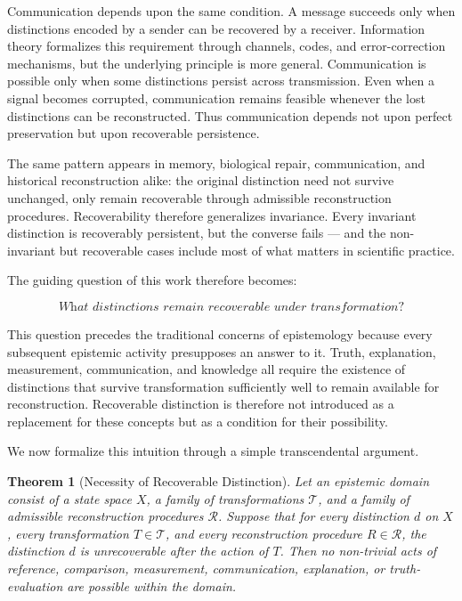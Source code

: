 \documentclass[12pt,oneside]{article}
\newtheorem{theorem}{Theorem}[section] \newtheorem{lemma}[theorem]{Lemma} \newtheorem{proposition}[theorem]{Proposition} \newtheorem{corollary}[theorem]{Corollary}
\theoremstyle{definition}
\begin{document}
Communication depends upon the same condition. A message succeeds only when distinctions encoded by a sender can be recovered by a receiver. Information theory formalizes this requirement through channels, codes, and error-correction mechanisms, but the underlying principle is more general. Communication is possible only when some distinctions persist across transmission. Even when a signal becomes corrupted, communication remains feasible whenever the lost distinctions can be reconstructed. Thus communication depends not upon perfect preservation but upon recoverable persistence.

The same pattern appears in memory, biological repair, communication, and historical reconstruction alike: the original distinction need not survive unchanged, only remain recoverable through admissible reconstruction procedures. Recoverability therefore generalizes invariance. Every invariant distinction is recoverably persistent, but the converse fails --- and the non-invariant but recoverable cases include most of what matters in scientific practice.

The guiding question of this work therefore becomes:

\[
\textit{What distinctions remain recoverable under transformation?}
\]

This question precedes the traditional concerns of epistemology because every subsequent epistemic activity presupposes an answer to it. Truth, explanation, measurement, communication, and knowledge all require the existence of distinctions that survive transformation sufficiently well to remain available for reconstruction. Recoverable distinction is therefore not introduced as a replacement for these concepts but as a condition for their possibility.

We now formalize this intuition through a simple transcendental argument.

\begin{theorem}[Necessity of Recoverable Distinction]
Let an epistemic domain consist of a state space \(X\), a family of transformations \(\mathcal{T}\), and a family of admissible reconstruction procedures \(\mathcal{R}\). Suppose that for every distinction \(d\) on \(X\), every transformation \(T\in\mathcal{T}\), and every reconstruction procedure \(R\in\mathcal{R}\), the distinction \(d\) is unrecoverable after the action of \(T\). Then no non-trivial acts of reference, comparison, measurement, communication, explanation, or truth-evaluation are possible within the domain.
\end{theorem}
\end{document}
